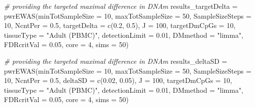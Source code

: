 \documentclass[]{article}
\newcommand{\hlnum}[1]{\textcolor[rgb]{0.816,0.125,0.439}{#1}}%
\newcommand{\hlstr}[1]{\textcolor[rgb]{0.251,0.627,0.251}{#1}}%
\newcommand{\hlcom}[1]{\textcolor[rgb]{0.502,0.502,0.502}{\textit{#1}}}%
\newcommand{\hlstd}[1]{\textcolor[rgb]{0.251,0.251,0.251}{#1}}%
\newcommand{\hlkwc}[1]{\textcolor[rgb]{0.251,0.251,0.251}{#1}}%
\newcommand{\hlkwd}[1]{\textcolor[rgb]{0.878,0.439,0.125}{#1}}%
\newenvironment{Shaded}{\begin{myshaded}}{\end{myshaded}}
\newcommand{\KeywordTok}[1]{\hlkwd{#1}}
\newcommand{\DataTypeTok}[1]{\hlkwc{#1}}
\newcommand{\DecValTok}[1]{\hlnum{#1}}
\newcommand{\FloatTok}[1]{\hlnum{#1}}
\newcommand{\StringTok}[1]{\hlstr{#1}}
\newcommand{\CommentTok}[1]{\hlcom{#1}}
\newcommand{\NormalTok}[1]{\hlstd{#1}}
\begin{document}
\begin{Shaded}
\begin{Highlighting}[]
\CommentTok{# providing the targeted maximal difference in DNAm}
\NormalTok{results_targetDelta =}\StringTok{ }\KeywordTok{pwrEWAS}\NormalTok{(}\DataTypeTok{minTotSampleSize =} \DecValTok{10}\NormalTok{,}
                    \DataTypeTok{maxTotSampleSize =} \DecValTok{50}\NormalTok{,}
                    \DataTypeTok{SampleSizeSteps =} \DecValTok{10}\NormalTok{,}
                    \DataTypeTok{NcntPer =} \FloatTok{0.5}\NormalTok{,}
                    \DataTypeTok{targetDelta =} \KeywordTok{c}\NormalTok{(}\FloatTok{0.2}\NormalTok{, }\FloatTok{0.5}\NormalTok{),}
                    \DataTypeTok{J =} \DecValTok{100}\NormalTok{,}
                    \DataTypeTok{targetDmCpGs =} \DecValTok{10}\NormalTok{,}
                    \DataTypeTok{tissueType =} \StringTok{"Adult (PBMC)"}\NormalTok{,}
                    \DataTypeTok{detectionLimit =} \FloatTok{0.01}\NormalTok{,}
                    \DataTypeTok{DMmethod =} \StringTok{"limma"}\NormalTok{,}
                    \DataTypeTok{FDRcritVal =} \FloatTok{0.05}\NormalTok{,}
                    \DataTypeTok{core =} \DecValTok{4}\NormalTok{,}
                    \DataTypeTok{sims =} \DecValTok{50}\NormalTok{)}

\CommentTok{# providing the targeted maximal difference in DNAm}
\NormalTok{results_deltaSD =}\StringTok{ }\KeywordTok{pwrEWAS}\NormalTok{(}\DataTypeTok{minTotSampleSize =} \DecValTok{10}\NormalTok{,}
                    \DataTypeTok{maxTotSampleSize =} \DecValTok{50}\NormalTok{,}
                    \DataTypeTok{SampleSizeSteps =} \DecValTok{10}\NormalTok{,}
                    \DataTypeTok{NcntPer =} \FloatTok{0.5}\NormalTok{,}
                    \DataTypeTok{deltaSD =} \KeywordTok{c}\NormalTok{(}\FloatTok{0.02}\NormalTok{, }\FloatTok{0.05}\NormalTok{),}
                    \DataTypeTok{J =} \DecValTok{100}\NormalTok{,}
                    \DataTypeTok{targetDmCpGs =} \DecValTok{10}\NormalTok{,}
                    \DataTypeTok{tissueType =} \StringTok{"Adult (PBMC)"}\NormalTok{,}
                    \DataTypeTok{detectionLimit =} \FloatTok{0.01}\NormalTok{,}
                    \DataTypeTok{DMmethod =} \StringTok{"limma"}\NormalTok{,}
                    \DataTypeTok{FDRcritVal =} \FloatTok{0.05}\NormalTok{,}
                    \DataTypeTok{core =} \DecValTok{4}\NormalTok{,}
                    \DataTypeTok{sims =} \DecValTok{50}\NormalTok{)}
\end{Highlighting}
\end{Shaded}
\end{document}
